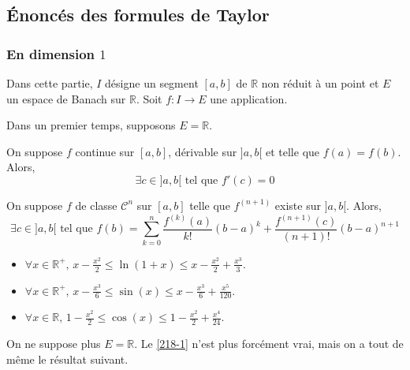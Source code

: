 




	\subsection{Énoncés des formules de Taylor}

	\subsubsection{En dimension \texorpdfstring{$1$}{1}}


	Dans cette partie, $I$ désigne un segment $[a,b]$ de $\mathbb{R}$ non réduit à un point et $E$ un espace de Banach sur $\mathbb{R}$. Soit $f : I \rightarrow E$ une application.

	Dans un premier temps, supposons $E = \mathbb{R}$.

	\begin{theorem}[Rolle]
		\label{218-1}
		On suppose $f$ continue sur $[a,b]$, dérivable sur $]a,b[$ et telle que $f(a) = f(b)$. Alors,
		\[ \exists c \in ]a,b[ \text{ tel que } f'(c) = 0 \]
	\end{theorem}

	\begin{theorem}
		On suppose $f$ de classe $\mathcal{C}^n$ sur $[a,b]$ telle que $f^{(n+1)}$ existe sur $]a,b[$. Alors,
		\[ \exists c \in ]a,b[ \text{ tel que } f(b) = \sum_{k=0}^{n} \frac{f^{(k)} (a)}{k!} (b-a)^k + \frac{f^{(n+1)}(c)}{(n+1)!} (b-a)^{n+1} \]
	\end{theorem}

	\begin{application}
		\begin{itemize}
			\item $\forall x \in \mathbb{R}^+, \, x - \frac{x^2}{2} \leq \ln(1+x) \leq x - \frac{x^2}{2} + \frac{x^3}{3}$.
			\item $\forall x \in \mathbb{R}^+, \, x - \frac{x^3}{6} \leq \sin(x) \leq x - \frac{x^3}{6} + \frac{x^5}{120}$.
			\item $\forall x \in \mathbb{R}, \, 1 - \frac{x^2}{2} \leq \cos(x) \leq 1 - \frac{x^2}{2} + \frac{x^4}{24}$.
		\end{itemize}
	\end{application}

	On ne suppose plus $E = \mathbb{R}$. Le \cref{218-1} n'est plus forcément vrai, mais on a tout de même le résultat suivant.

